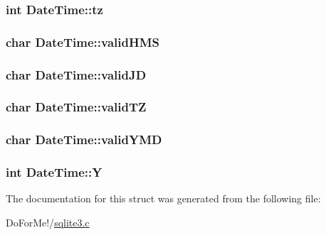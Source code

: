 \hypertarget{struct_date_time_a7f5c2e587ee18014982d85eb616f09b8}{
\subsubsection[{tz}]{\setlength{\rightskip}{0pt plus 5cm}int Date\-Time\-::tz}}\label{struct_date_time_a7f5c2e587ee18014982d85eb616f09b8}
\hypertarget{struct_date_time_aba26b32c6142cf6bfc09db3088b90add}{
\subsubsection[{valid\-H\-M\-S}]{\setlength{\rightskip}{0pt plus 5cm}char Date\-Time\-::valid\-H\-M\-S}}\label{struct_date_time_aba26b32c6142cf6bfc09db3088b90add}
\hypertarget{struct_date_time_a1962742892150a03dc5d302f43efbb04}{
\subsubsection[{valid\-J\-D}]{\setlength{\rightskip}{0pt plus 5cm}char Date\-Time\-::valid\-J\-D}}\label{struct_date_time_a1962742892150a03dc5d302f43efbb04}
\hypertarget{struct_date_time_af3dfda2bdbb2183dc1b94f449701b81e}{
\subsubsection[{valid\-T\-Z}]{\setlength{\rightskip}{0pt plus 5cm}char Date\-Time\-::valid\-T\-Z}}\label{struct_date_time_af3dfda2bdbb2183dc1b94f449701b81e}
\hypertarget{struct_date_time_aaa042bec0879cd922039062433f4b26f}{
\subsubsection[{valid\-Y\-M\-D}]{\setlength{\rightskip}{0pt plus 5cm}char Date\-Time\-::valid\-Y\-M\-D}}\label{struct_date_time_aaa042bec0879cd922039062433f4b26f}
\hypertarget{struct_date_time_ad39449618b2a15128e32766a208753cf}{
\subsubsection[{Y}]{\setlength{\rightskip}{0pt plus 5cm}int Date\-Time\-::\-Y}}\label{struct_date_time_ad39449618b2a15128e32766a208753cf}


The documentation for this struct was generated from the following file\-:\begin{DoxyCompactItemize}
\item 
Do\-For\-Me!/\hyperlink{sqlite3_8c}{sqlite3.\-c}\end{DoxyCompactItemize}
